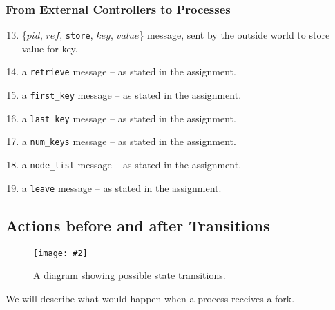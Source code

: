 \documentclass[11pt]{article}
\newcommand{\pic}[2]{\begin{center}\texttt{[image: \#2]}\end{center}}
\begin{document}
\subsubsection{From External Controllers to Processes}
\begin{enumerate}[M1]
\setcounter{enumi}{12}
\newcommand{\store}{\texttt{store}}
\newcommand{\retrieve}{\texttt{retrieve}}
\newcommand{\firstKey}{\texttt{first\_key}}
\newcommand{\lastKey}{\texttt{last\_key}}
\newcommand{\numKeys}{\texttt{num\_keys}}
\newcommand{\nodeList}{\texttt{node\_list}}
\newcommand{\leave}{\texttt{leave}}

\item \{$pid$, $ref$, \store, $key$, $value$\} message, sent by the outside world to store value for key.
\item a {\retrieve} message -- as stated in the assignment.
\item a {\firstKey} message -- as stated in the assignment.
\item a {\lastKey} message -- as stated in the assignment.
\item a {\numKeys} message -- as stated in the assignment.
\item a {\nodeList} message -- as stated in the assignment.
\item a {\leave} message  -- as stated in the assignment.
\end{enumerate}


\subsection{Actions before and after Transitions}
\begin{figure}[H]
\pic{0.6}{diagram}
\label{fig:diagram}
\caption{A diagram showing possible state transitions.}
\end{figure}

We will describe what would happen when a process receives a fork.
\end{document}
